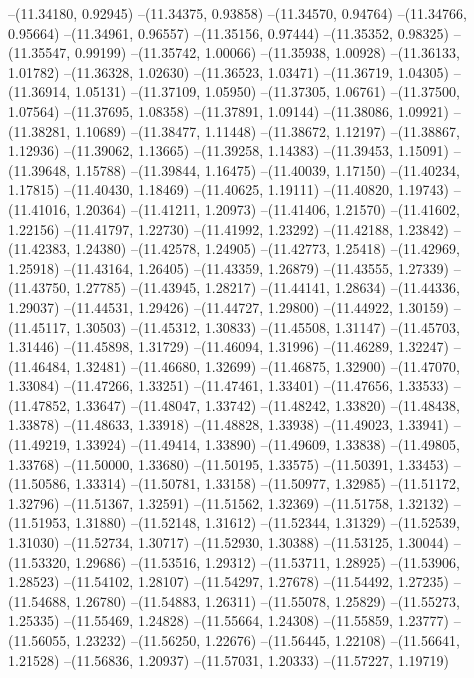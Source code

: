 --(11.34180, 0.92945)
--(11.34375, 0.93858)
--(11.34570, 0.94764)
--(11.34766, 0.95664)
--(11.34961, 0.96557)
--(11.35156, 0.97444)
--(11.35352, 0.98325)
--(11.35547, 0.99199)
--(11.35742, 1.00066)
--(11.35938, 1.00928)
--(11.36133, 1.01782)
--(11.36328, 1.02630)
--(11.36523, 1.03471)
--(11.36719, 1.04305)
--(11.36914, 1.05131)
--(11.37109, 1.05950)
--(11.37305, 1.06761)
--(11.37500, 1.07564)
--(11.37695, 1.08358)
--(11.37891, 1.09144)
--(11.38086, 1.09921)
--(11.38281, 1.10689)
--(11.38477, 1.11448)
--(11.38672, 1.12197)
--(11.38867, 1.12936)
--(11.39062, 1.13665)
--(11.39258, 1.14383)
--(11.39453, 1.15091)
--(11.39648, 1.15788)
--(11.39844, 1.16475)
--(11.40039, 1.17150)
--(11.40234, 1.17815)
--(11.40430, 1.18469)
--(11.40625, 1.19111)
--(11.40820, 1.19743)
--(11.41016, 1.20364)
--(11.41211, 1.20973)
--(11.41406, 1.21570)
--(11.41602, 1.22156)
--(11.41797, 1.22730)
--(11.41992, 1.23292)
--(11.42188, 1.23842)
--(11.42383, 1.24380)
--(11.42578, 1.24905)
--(11.42773, 1.25418)
--(11.42969, 1.25918)
--(11.43164, 1.26405)
--(11.43359, 1.26879)
--(11.43555, 1.27339)
--(11.43750, 1.27785)
--(11.43945, 1.28217)
--(11.44141, 1.28634)
--(11.44336, 1.29037)
--(11.44531, 1.29426)
--(11.44727, 1.29800)
--(11.44922, 1.30159)
--(11.45117, 1.30503)
--(11.45312, 1.30833)
--(11.45508, 1.31147)
--(11.45703, 1.31446)
--(11.45898, 1.31729)
--(11.46094, 1.31996)
--(11.46289, 1.32247)
--(11.46484, 1.32481)
--(11.46680, 1.32699)
--(11.46875, 1.32900)
--(11.47070, 1.33084)
--(11.47266, 1.33251)
--(11.47461, 1.33401)
--(11.47656, 1.33533)
--(11.47852, 1.33647)
--(11.48047, 1.33742)
--(11.48242, 1.33820)
--(11.48438, 1.33878)
--(11.48633, 1.33918)
--(11.48828, 1.33938)
--(11.49023, 1.33941)
--(11.49219, 1.33924)
--(11.49414, 1.33890)
--(11.49609, 1.33838)
--(11.49805, 1.33768)
--(11.50000, 1.33680)
--(11.50195, 1.33575)
--(11.50391, 1.33453)
--(11.50586, 1.33314)
--(11.50781, 1.33158)
--(11.50977, 1.32985)
--(11.51172, 1.32796)
--(11.51367, 1.32591)
--(11.51562, 1.32369)
--(11.51758, 1.32132)
--(11.51953, 1.31880)
--(11.52148, 1.31612)
--(11.52344, 1.31329)
--(11.52539, 1.31030)
--(11.52734, 1.30717)
--(11.52930, 1.30388)
--(11.53125, 1.30044)
--(11.53320, 1.29686)
--(11.53516, 1.29312)
--(11.53711, 1.28925)
--(11.53906, 1.28523)
--(11.54102, 1.28107)
--(11.54297, 1.27678)
--(11.54492, 1.27235)
--(11.54688, 1.26780)
--(11.54883, 1.26311)
--(11.55078, 1.25829)
--(11.55273, 1.25335)
--(11.55469, 1.24828)
--(11.55664, 1.24308)
--(11.55859, 1.23777)
--(11.56055, 1.23232)
--(11.56250, 1.22676)
--(11.56445, 1.22108)
--(11.56641, 1.21528)
--(11.56836, 1.20937)
--(11.57031, 1.20333)
--(11.57227, 1.19719)
